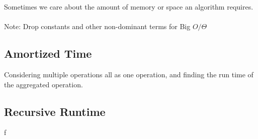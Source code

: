 \documentclass[12pt]{article}
\begin{document}
Sometimes we care about the amount of memory or space an algorithm requires.
\\
\\
Note: Drop constants and other non-dominant terms for Big $O \slash \Theta$

\subsection{Amortized Time}

Considering multiple operations all as one operation, and finding the run time of the aggregated operation. 
\subsection{Recursive Runtime}

f
\end{document}
